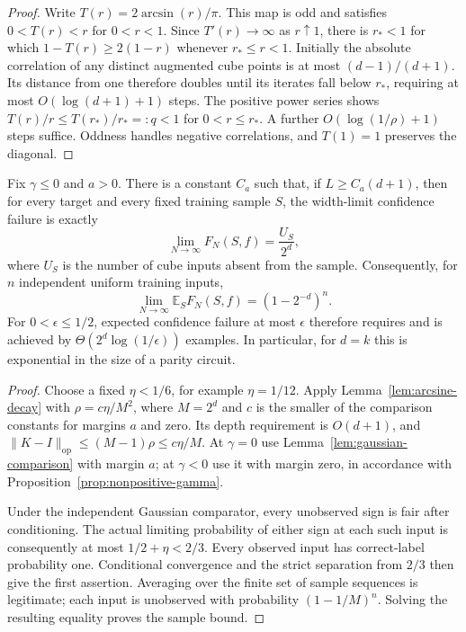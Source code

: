 \begin{proof}
Write $T(r)=2\arcsin(r)/\pi$. This map is odd and satisfies
$0<T(r)<r$ for $0<r<1$. Since $T'(r)\to\infty$ as $r\uparrow1$,
there is $r_*<1$ for which
$1-T(r)\ge2(1-r)$ whenever $r_*\le r<1$.
Initially the absolute correlation of any distinct augmented cube
points is at most $(d-1)/(d+1)$. Its distance from one therefore
doubles until its iterates fall below $r_*$, requiring at most
$O(\log(d+1)+1)$ steps. The positive power series shows
$T(r)/r\le T(r_*)/r_*=:q<1$ for $0<r\le r_*$.
A further $O(\log(1/\rho)+1)$ steps suffice. Oddness handles
negative correlations, and $T(1)=1$ preserves the diagonal.
\end{proof}

\begin{theorem}
\label{thm:deep-confidence}
Fix $\gamma\le0$ and $a>0$. There is a constant $C_a$ such that,
if $L\ge C_a(d+1)$, then for every target and every fixed training
sample $S$, the width-limit confidence failure is exactly
\[
 \lim_{N\to\infty}F_N(S,f)=\frac{U_S}{2^d},
\]
where $U_S$ is the number of cube inputs absent from the sample.
Consequently, for $n$ independent uniform training inputs,
\begin{equation}\label{eq:deep-exact-confidence}
 \lim_{N\to\infty}\mathbb E_S F_N(S,f)
       =(1-2^{-d})^n.
\end{equation}
For $0<\epsilon\le1/2$, expected confidence failure at most
$\epsilon$ therefore requires and is achieved by
$\Theta(2^d\log(1/\epsilon))$ examples. In particular, for $d=k$
this is exponential in the size of a parity circuit.
\end{theorem}

\begin{proof}
Choose a fixed $\eta<1/6$, for example $\eta=1/12$.
Apply Lemma~\ref{lem:arcsine-decay} with
$\rho=c\eta/M^2$, where $M=2^d$ and $c$ is the smaller of the
comparison constants for margins $a$ and zero. Its depth requirement
is $O(d+1)$, and
$\|K-I\|_{\mathrm{op}}\le(M-1)\rho\le c\eta/M$.
At $\gamma=0$ use Lemma~\ref{lem:gaussian-comparison} with margin
$a$; at $\gamma<0$ use it with margin zero, in accordance with
Proposition~\ref{prop:nonpositive-gamma}.

Under the independent Gaussian comparator, every unobserved sign
is fair after conditioning. The actual limiting probability of
either sign at each such input is consequently at most
$1/2+\eta<2/3$. Every observed input has correct-label probability
one. Conditional convergence and the strict separation from $2/3$
then give the first assertion. Averaging over the finite set of
sample sequences is legitimate; each input is unobserved with
probability $(1-1/M)^n$. Solving the resulting equality proves the
sample bound.
\end{proof}


